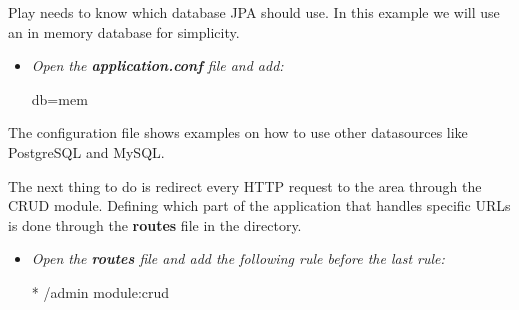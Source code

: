 Play needs to know which database JPA should use. In this example we will use an in memory database for simplicity.
\begin{itemize}
  \item \emph{Open the \textbf{application.conf} file and add:}
  \begin{plainlisting}
db=mem
  \end{plainlisting}
\end{itemize}
The configuration file shows examples on how to use other datasources like PostgreSQL and MySQL.

The next thing to do is redirect every HTTP request to the  area through the CRUD module. Defining which part of the application that handles specific URLs is done through the \textbf{routes} file in the  directory.
\begin{itemize}
  \item \emph{Open the \textbf{routes} file and add the following rule before the last rule:}
  \begin{plainlisting}
*     /admin    module:crud
  \end{plainlisting}
\end{itemize}


